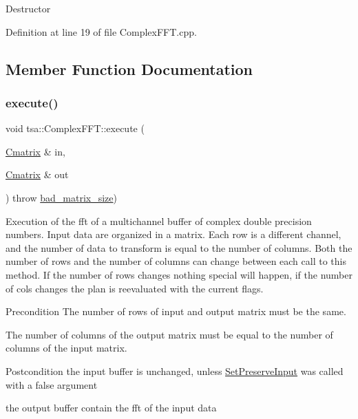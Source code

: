 Destructor 

Definition at line 19 of file Complex\+F\+F\+T.\+cpp.



\subsection{Member Function Documentation}
\mbox{\label{classtsa_1_1_complex_f_f_t_ada17028929521c35d3505010846a9ed5}} 
\subsubsection{\texorpdfstring{execute()}{execute()}}
{\footnotesize\ttfamily void tsa\+::\+Complex\+F\+F\+T\+::execute (\begin{DoxyParamCaption}\item[{\hyperlink{namespacetsa_a86348fef1603a135fe5fba9e5f5486ee}{Cmatrix} \&}]{in,  }\item[{\hyperlink{namespacetsa_a86348fef1603a135fe5fba9e5f5486ee}{Cmatrix} \&}]{out }\end{DoxyParamCaption}) throw  \hyperlink{classtsa_1_1bad__matrix__size}{bad\+\_\+matrix\+\_\+size}) }

Execution of the fft of a multichannel buffer of complex double precision numbers. Input data are organized in a matrix. Each row is a different channel, and the number of data to transform is equal to the number of columns. Both the number of rows and the number of columns can change between each call to this method. If the number of rows changes nothing special will happen, if the number of cols changes the plan is reevaluated with the current flags.

\begin{DoxyPrecond}{Precondition}
The number of rows of input and output matrix must be the same. 

The number of columns of the output matrix must be equal to the number of columns of the input matrix. 
\end{DoxyPrecond}
\begin{DoxyPostcond}{Postcondition}
the input buffer is unchanged, unless \hyperlink{classtsa_1_1_base_f_f_t_a5b1e2f36dbdfe197aa6c74d1cf963f40}{Set\+Preserve\+Input} was called with a false argument 

the output buffer contain the fft of the input data
\end{DoxyPostcond}

